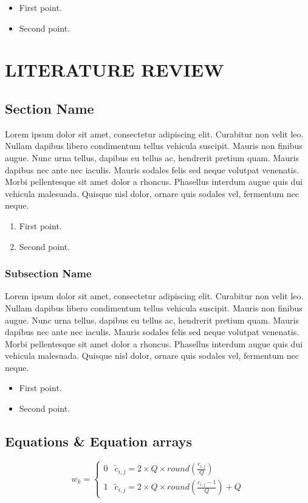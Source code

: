 \documentclass[12pt,a4paper]{report}
\begin{document}
\begin{itemize}
\item First point.
\item Second point.
\end{itemize}




\chapter{LITERATURE REVIEW}

\section{Section Name}
Lorem ipsum dolor sit amet, consectetur adipiscing elit. Curabitur non velit leo. Nullam dapibus libero condimentum tellus vehicula suscipit. Mauris non finibus augue. Nunc urna tellus, dapibus eu tellus ac, hendrerit pretium quam. Mauris dapibus nec ante nec iaculis. Mauris sodales felis sed neque volutpat venenatis. Morbi pellentesque sit amet dolor a rhoncus. Phasellus interdum augue quis dui vehicula malesuada. Quisque nisl dolor, ornare quis sodales vel, fermentum nec neque. 

\begin{enumerate}
\item First point.
\item Second point.
\end{enumerate}

\subsection{Subsection Name}
Lorem ipsum dolor sit amet, consectetur adipiscing elit. Curabitur non velit leo. Nullam dapibus libero condimentum tellus vehicula suscipit. Mauris non finibus augue. Nunc urna tellus, dapibus eu tellus ac, hendrerit pretium quam. Mauris dapibus nec ante nec iaculis. Mauris sodales felis sed neque volutpat venenatis. Morbi pellentesque sit amet dolor a rhoncus. Phasellus interdum augue quis dui vehicula malesuada. Quisque nisl dolor, ornare quis sodales vel, fermentum nec neque. 

\begin{itemize}
\item First point.
\item Second point.
\end{itemize}

\section{Equations \& Equation arrays}
\begin{equation} \label{Eq:aa}
w_k = \left \{ \begin{matrix}
0 & \tilde{c}_{i,j} = 2\times Q\times round\left ( \frac{c_{i,j}}{Q} \right )\\ 
1 & \tilde{c}_{i,j} = 2\times Q\times round\left ( \frac{c_{i,j}-1}{Q} \right ) +Q
\end{matrix} \right.
\end{equation} 
\end{document}
